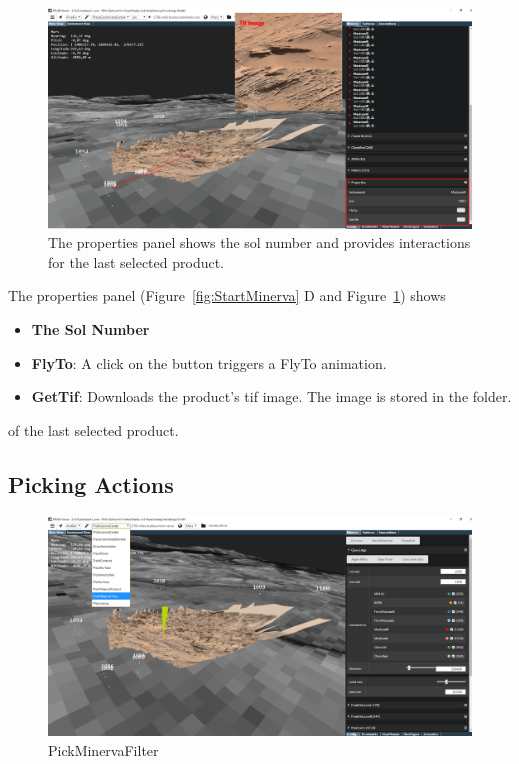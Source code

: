 \begin{figure}[h]
				\centering
					\includegraphics[width=1\textwidth]{pics/PropertiesAI.png}
				\caption[Product Properties]{The properties panel shows the sol number and provides interactions for the last selected product.}
				\label{fig:ProductProperties}
		 \end{figure}
		
The properties panel (Figure~\ref{fig:StartMinerva} D and Figure~\ref{fig:ProductProperties}) shows
\begin{itemize}
  \item \textbf{The Sol Number}
	\item \textbf{FlyTo}: A click on the button triggers a FlyTo animation.
	\item \textbf{GetTif}: Downloads the product's tif image. The image is stored in the  folder.
\end{itemize}
of the last selected product.

\subsection{Picking Actions}
\label{sec:minervaPicking}

\begin{figure}[h]
				\centering
					\includegraphics[width=1\textwidth]{pics/PickMinervaFilter.png}
				\caption[Pick Minerva Filter]{PickMinervaFilter}
				\label{fig:PickMinervaFilter}
		 \end{figure}
		
